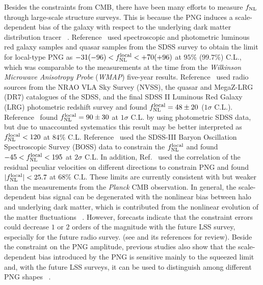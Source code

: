 \documentclass[twocolumn,floatfix,nofootinbib,aps,reprint]{revtex4}
\def\flocal{{f^{\rm local}_{\rm NL}}}
\begin{document}
Besides the constraints from CMB, there have been many efforts to measure 
$f_{\rm NL}$ through large-scale structure surveys. This is because the PNG 
induces a scale-dependent 
bias of the galaxy with respect to the underlying dark matter distribution 
tracer ~\cite{2008PhRvD..77l3514D,2008ApJ...677L..77M,2008ApJ...684L...1C, 
2008JCAP...08..031S, 2011PhRvD..84f3512D, 2012PhRvD..86f3518M,
2015arXiv150705903R}. 
Reference~\cite{2008JCAP...08..031S} used spectroscopic and photometric luminous 
red galaxy samples and quasar samples from the SDSS survey to obtain the limit 
for local-type PNG as $-31(-96)< f^{\rm local}_{\rm NL}<+70(+96)$ at 
$95\%$ ($99.7\%$) C.L., which was comparable to the measurements at the time from the
{\it Wilkinson Microwave Anisotropy Probe} ({\it WMAP}) five-year results. 
Reference~\cite{Xia11} used radio sources from the NRAO VLA Sky Survey (NVSS), 
the quasar and MegaZ-LRG (DR7) catalogues of
the SDSS, and the final SDSS II Luminous Red Galaxy (LRG) photometric 
redshift survey and found $f^{\rm local}_{\rm NL}=48 \pm 20$ ($1\sigma$ C.L.). 
Reference~\cite{Nikoloudakis13} found $f^{\rm local}_{\rm NL} = 90 \pm 30$ at 
$1\sigma$ C.L. by using photometric SDSS data, but due to unaccounted systematics 
this result may be better interpreted as $f^{\rm local}_{\rm NL} < 120$ 
at $84\%$ C.L. Reference~\cite{Ross13} used the 
SDSS-III Baryon Oscillation Spectroscopic Survey (BOSS)
data to constrain the $\flocal$ and found $-45<\flocal < 195$ at $2\sigma$ C.L. 
In addition, Ref.~\cite{2013MNRAS.436.2029M} used the correlation of 
the residual peculiar velocities on different directions to constrain 
PNG and found $|\flocal|<25.7$ at $68\%$ C.L. 
These limits are currently consistent with but weaker than the measurements 
from the {\it Planck} CMB observation.  
In general, the scale-dependent bias signal can be degenerated with 
the nonlinear bias between halo and underlying dark matter, which is
contributed from the nonlinear evolution of the matter fluctuations
~\cite{2016arXiv161206366G}.
However, forecasts indicate that the constraint errors could decrease 
$1$ or $2$ orders of the magnitude with the future LSS survey, especially 
for the future radio survey. (see \cite{2016arXiv161109787D} and its 
references for review). 
Beside the constraint on the PNG amplitude, previous studies also
show that the scale-dependent bias introduced by the PNG is sensitive 
mainly to the squeezed limit and, with the future LSS surveys, 
it can be used to distinguish among different PNG shapes
~\cite{2012JCAP...08..019N,2012JCAP...08..033S}.
\end{document}
